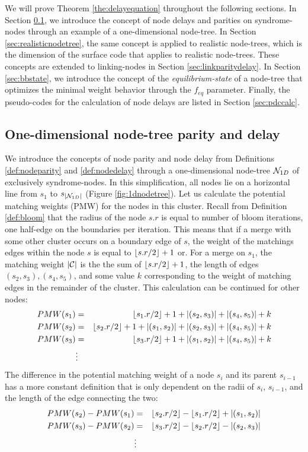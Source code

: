 We will prove Theorem \ref{the:delayequation} throughout the following sections. In Section \ref{sec:1dnodetree}, we introduce the concept of node delays and parities on syndrome-nodes through an example of a one-dimensional node-tree. In Section \ref{sec:realisticnodetree}, the same concept is applied to realistic node-trees, which is the dimension of the surface code that applies to realistic node-trees. These concepts are extended to linking-nodes in Section \ref{sec:linkparitydelay}. In Section \ref{sec:bbstate}, we introduce the concept of the \emph{equilibrium-state} of a node-tree that optimizes the minimal weight behavior through the $f_{eq}$ parameter. Finally, the pseudo-codes for the calculation of node delays are listed in Section \ref{sec:pdccalc}.

\subsection{One-dimensional node-tree parity and delay}\label{sec:1dnodetree}

We introduce the concepts of node parity and node delay from Definitions \ref{def:nodeparity} and \ref{def:nodedelay} through a one-dimensional node-tree $\mathcal{N}_{1D}$ of exclusively syndrome-nodes. In this simplification, all nodes lie on a horizontal line from $s_1$ to $s_{|\mathcal{N}_{1D}|}$ (Figure \ref{fig:1dnodetree}). Let us calculate the potential matching weights (PMW) for the nodes in this cluster. Recall from Definition \ref{def:bloom} that the radius of the node $s.r$ is equal to number of bloom iterations, one half-edge on the boundaries per iteration. This means that if a merge with some other cluster occurs on a boundary edge of $s$, the weight of the matchings edges within the node $s$ is equal to ${\left \lfloor s.r/2 \right \rfloor }+1$ or. For a merge on $s_1$, the matching weight $|\mathcal{C}|$ is the the sum of ${\left \lfloor s.r/2 \right \rfloor }+1$, the length of edges $(s_2,s_3), (s_4,s_5)$, and some value $k$ corresponding to the weight of matching edges in the remainder of the cluster. This calculation can be continued for other nodes:
\begin{eqnarray*}
  PMW(s_1) &=& {\left \lfloor s_1.r/2 \right \rfloor }+1 + \abs{(s_2,s_3)} + \abs{(s_4,s_5)} + k \\
  PMW(s_2) &=& {\left \lfloor s_2.r/2 \right \rfloor }+1 + \abs{(s_1,s_2)} + \abs{(s_2,s_3)} + \abs{(s_4,s_5)} + k \\
  PMW(s_3) &=& {\left \lfloor s_3.r/2 \right \rfloor }+1 + \abs{(s_1,s_2)} + \abs{(s_4,s_5)} + k\\
  &\vdots&
\end{eqnarray*}
The difference in the potential matching weight of a node $s_i$ and its parent $s_{i-1}$ has a more constant definition that is only dependent on the radii of $s_i$,  $s_{i-1}$, and the length of the edge connecting the two:
\begin{eqnarray*}
  PMW(s_2) - PMW(s_1) &=& {\left \lfloor s_2.r/2 \right \rfloor } - {\left \lfloor s_1.r/2 \right \rfloor } + \abs{(s_1,s_2)} \\
  PMW(s_3) - PMW(s_2) &=& {\left \lfloor s_3.r/2 \right \rfloor } - {\left \lfloor s_2.r/2 \right \rfloor } - \abs{(s_2,s_3)} \\
  &\vdots&
\end{eqnarray*}

